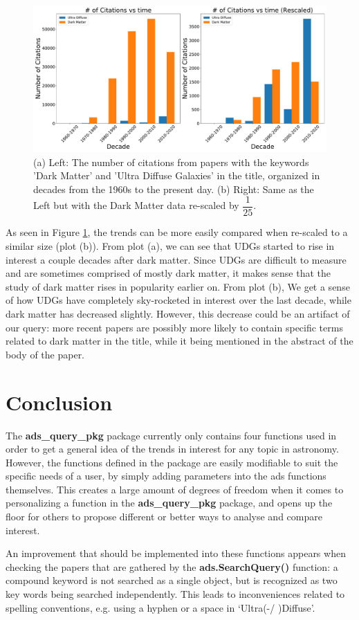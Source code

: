 \documentclass[10pt, letterpaper]{article}
\begin{document}
\begin{figure}[H]
    \hspace*{-5mm}
        \centering
        \includegraphics[width =\textwidth]{comparison.pdf}
        \caption{(a) Left: The number of citations from papers with the keywords 'Dark Matter' and 'Ultra Diffuse Galaxies' in the title, organized in decades from the 1960s to the present day.  (b) Right: Same as the Left but with the Dark Matter data re-scaled by $\dfrac{1}{25}$.}
        \label{fig:y2}
\end{figure}

As seen in Figure \ref{fig:y2}, the trends can be more easily compared when re-scaled to a similar size (plot (b)). From plot (a), we can see that UDGs started to rise in interest a couple decades after dark matter. Since UDGs are difficult to measure and are sometimes comprised of mostly dark matter, it makes sense that the study of dark matter rises in popularity earlier on. From plot (b), We get a sense of how UDGs have completely sky-rocketed in interest over the last decade, while dark matter has decreased slightly. However, this decrease could be an artifact of our query: more recent papers are possibly more likely to contain specific terms related to dark matter in the title, while it being mentioned in the abstract of the body of the paper.



\section{Conclusion}

The \textbf{ads\_query\_pkg} package currently only contains four functions used in order to get a general idea of the trends in interest for any topic in astronomy. However, the functions defined in the package are easily modifiable to suit the specific needs of a user, by simply adding parameters into the ads functions themselves. This creates a large amount of degrees of freedom when it comes to personalizing a function in the \textbf{ads\_query\_pkg} package, and opens up the floor for others to propose different or better ways to analyse and compare interest.

An improvement that should be implemented into these functions appears when checking the papers that are gathered by the \textbf{ads.SearchQuery()} function: a compound keyword is not searched as a single object, but is recognized as two key words being searched independently. This leads to inconveniences related to spelling conventions, e.g. using a hyphen or a space in `Ultra(-/ )Diffuse'.
\end{document}
